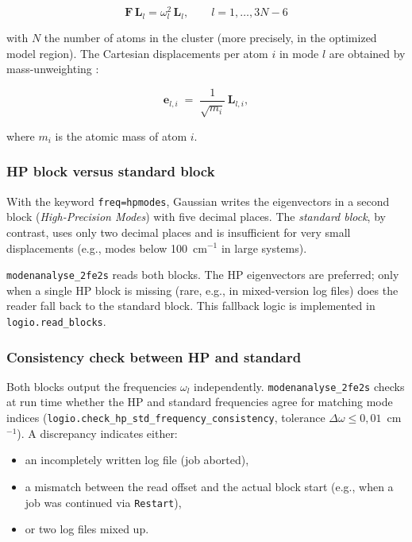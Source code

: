 \documentclass[11pt,a4paper,twoside]{article}
\newcommand{\evec}{\mathbf{e}}
\theoremstyle{remark}
\begin{document}
\begin{equation}
  \mathbf{F}\,\mathbf{L}_l = \omega_l^2 \, \mathbf{L}_l ,
  \qquad l = 1, \ldots, 3N-6
  \label{eq:fg-eigenproblem}
\end{equation}

with $N$ the number of atoms in the cluster (more precisely, in the
optimized model region). The Cartesian displacements per atom $i$ in
mode $l$ are obtained by mass-unweighting
\cite{WilsonDeciusCross1955}:

\begin{equation}
  \evec_{l,i} \;=\; \frac{1}{\sqrt{m_i}}\,\mathbf{L}_{l,i} ,
  \label{eq:demass}
\end{equation}

where $m_i$ is the atomic mass of atom $i$.

\subsubsection*{HP block versus standard block}

With the keyword \texttt{freq=hpmodes}, Gaussian writes the
eigenvectors in a second block (\emph{High-Precision Modes}) with
five decimal places. The \emph{standard block}, by contrast, uses
only two decimal places and is insufficient for very small
displacements (e.g., modes below 100~cm$^{-1}$ in large systems).

\texttt{modenanalyse\_2fe2s} reads both blocks. The HP eigenvectors
are preferred; only when a single HP block is missing (rare, e.g.,
in mixed-version log files) does the reader fall back to the
standard block. This fallback logic is implemented in
\texttt{logio.read\_blocks}.

\subsubsection*{Consistency check between HP and standard}
\label{sec:hp-std-check}

Both blocks output the frequencies $\omega_l$ independently.
\texttt{modenanalyse\_2fe2s} checks at run time whether the HP and
standard frequencies agree for matching mode indices
(\texttt{logio.check\_hp\_std\_frequency\_consistency}, tolerance
$\Delta\omega \leq 0{,}01$~cm$^{-1}$). A discrepancy indicates either:

\begin{itemize}
  \item an incompletely written log file (job aborted),
  \item a mismatch between the read offset and the actual block
        start (e.g., when a job was continued via \texttt{Restart}),
  \item or two log files mixed up.
\end{itemize}
\end{document}
